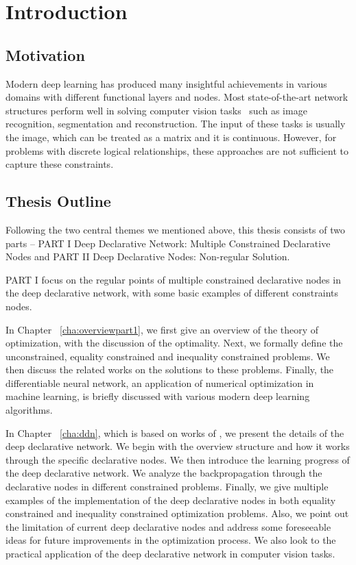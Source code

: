 \chapter{Introduction}
\label{cha:intro}

\section{Motivation}
\label{sec:motivation}
Modern deep learning has produced many insightful achievements in various domains with different functional layers and nodes. Most state-of-the-art network structures perform well in solving computer vision tasks~\citep{SK:14, HK:16, SM:18} such as image recognition, segmentation and reconstruction. The input of these tasks is usually the image, which can be treated as a matrix and it is continuous. However, for problems with discrete logical relationships, these approaches are not sufficient to capture these constraints. 



\section{Thesis Outline}
\label{sec:outline}
Following the two central themes we mentioned above, this thesis consists of two parts -- PART I Deep Declarative Network: Multiple Constrained Declarative Nodes and PART II Deep Declarative Nodes: Non-regular Solution. 
\par PART I focus on the regular points of multiple constrained declarative nodes in the deep declarative network, with some basic examples of different constraints nodes. 
\begin{description}
    \item In Chapter ~\ref{cha:overviewpart1}, we first give an overview of the theory of optimization, with the discussion of the optimality. Next, we formally define the unconstrained, equality constrained and inequality constrained problems. We then discuss the related works on the solutions to these problems. Finally, the differentiable neural network, an application of numerical optimization in machine learning, is briefly discussed with various modern deep learning algorithms.  
    \item In Chapter ~\ref{cha:ddn}, which is based on works of \cite{SG:19}, we present the details of the deep declarative network. We begin with the overview structure and how it works through the specific declarative nodes. We then introduce the learning progress of the deep declarative network. We analyze the backpropagation through the declarative nodes in different constrained problems. Finally, we give multiple examples of the implementation of the deep declarative nodes in both equality constrained and inequality constrained optimization problems. Also, we point out the limitation of current deep declarative nodes and address some foreseeable ideas for future improvements in the optimization process. We also look to the practical application of the deep declarative network in computer vision tasks.
\end{description}

